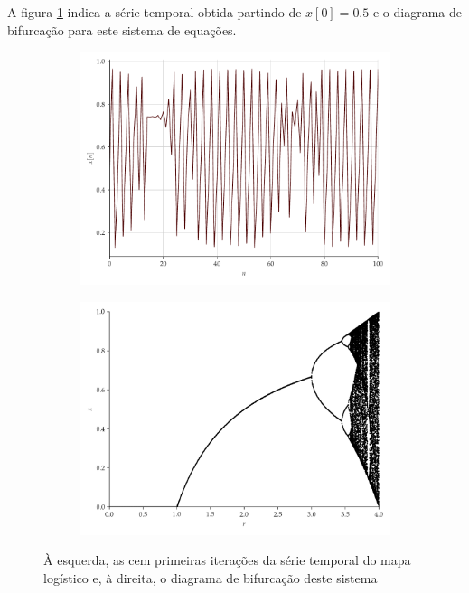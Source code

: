 \documentclass[a4paper, 12pt]{article}
\begin{document}
A figura \ref{fig:logistic} indica a série temporal obtida partindo de $x[0] = 0.5$ e o diagrama de bifurcação para este sistema de equações.
\begin{figure}[H]
     \begin{subfigure}[t]{0.35\textwidth} 
         \includegraphics[scale=0.35]{serie-logistico.pdf}
     \end{subfigure}
     \centering
     \begin{subfigure}[t]{0.35\textwidth} 
         \includegraphics[scale=0.35]{mapa-logistico.png}
     \end{subfigure}
     \caption{À esquerda, as cem primeiras iterações da série temporal do mapa logístico e, à direita, o diagrama de bifurcação deste sistema}
     \label{fig:logistic}
\end{figure}
\end{document}
